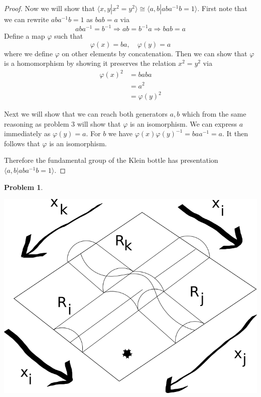\documentclass[10pt]{article}
\newcommand{\sk}{\vskip 10mm}
\theoremstyle{plain}
\newtheorem{problem}{Problem}
\theoremstyle{remark}
\begin{document}
\begin{proof}
  Now we will show that $\langle x,y| x^2=y^2\rangle\cong \langle a,b|aba^{-1}b=1\rangle$. First note that we
  can rewrite $aba^{-1}b=1$ as $bab=a$ via
  \[ aba^{-1}=b^{-1}\Rightarrow ab=b^{-1}a\Rightarrow bab=a \]
  Define a map $\varphi$ such that
  \[ \varphi(x)=ba,\quad \varphi(y)=a\]
  where we define $\varphi$ on other elements by concatenation.
  Then we can show that $\varphi$ is a homomorphism by showing it preserves the relation
  $x^2=y^2$ via
  \begin{align*}
    \varphi(x)^2 &= baba\\
          &= a^2\\
          &= \varphi(y)^2
  \end{align*}

  Next we will show that we can reach both generators $a,b$ which from the same reasoning
  as problem $3$ will show that $\varphi$ is an isomorphism. We can express $a$ immediately
  as $\varphi(y)=a$. For $b$ we have $\varphi(x)\varphi(y)^{-1}=baa^{-1}=a$. It then follows that $\varphi$
  is an isomorphism.

  Therefore the fundamental group of the Klein bottle has presentation
  $\langle a,b|aba^{-1}b=1\rangle$.
\end{proof}

\sk

\begin{problem} %
  
\end{problem}

\includegraphics[scale=.5]{wirt}
\end{document}
